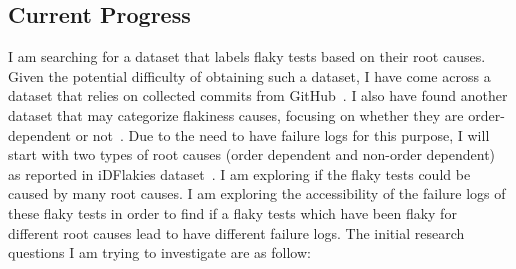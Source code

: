 

\subsection{Current Progress}

I am searching for a dataset that labels flaky tests based on their root causes. Given the potential difficulty of obtaining such a dataset, I have come across a dataset that relies on collected commits from GitHub~\cite{akli2023flakycat}. I also have found another dataset that may categorize flakiness causes, focusing on whether they are order-dependent or not~\cite{lam2019idflakies}. Due to the need to have failure logs for this purpose, I will start with two types of root causes (order dependent and non-order dependent) as reported in iDFlakies dataset~\cite{lam2019idflakies}. 
I am exploring if the flaky tests could be caused by many root causes. I am exploring the accessibility of the failure logs of these flaky tests in order to find if a flaky tests which have been flaky for different root causes lead to have different failure logs. The initial research questions I am trying to investigate are as follow:



